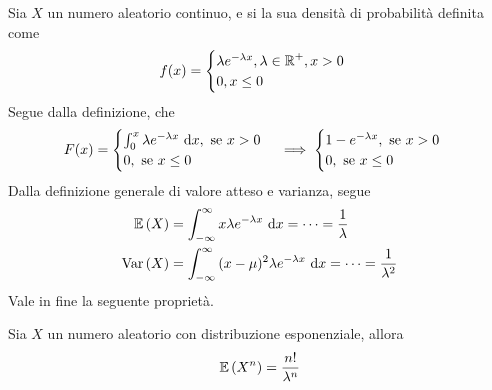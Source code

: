 \documentclass{subfiles}
\begin{document}
Sia \(X\) un numero aleatorio continuo, e si la sua densità di probabilità definita come
\[
    f(x) = \begin{cases}
        \lambda e^{-\lambda x}, \lambda \in \operatorname{\mathbb{R}}^{+}, x > 0 \\
        0, x \le 0
    \end{cases}\]
Segue dalla definizione, che
\[
    F(x) = \begin{cases}
        \Int{\lambda e^{-\lambda x}}{x}[0][x], \text{se} x > 0 \\
        0, \text{se} x \le 0
    \end{cases}   \implies \begin{cases}
        1 - e^{-\lambda x}, \text{se} x > 0 \\
        0, \text{se} x \le 0
    \end{cases}\]
Dalla definizione generale di valore atteso e varianza, segue
\[\begin{aligned}
        \Expected{X} & = \Int{x \lambda e^{-\lambda x}}{x}[-\infty][\infty] = \cdots = \Frac{1}{\lambda}               \\
        \Var{X}      & = \Int{(x - \mu)^2 \lambda e^{-\lambda x}}{x}[-\infty][\infty] = \cdots = \Frac{1}{\lambda^{2}}
    \end{aligned}\]
Vale in fine la seguente proprietà.
\begin{Property*}
    Sia \(X\) un numero aleatorio con distribuzione esponenziale, allora
    \[
        \Expected{X^{n}} = \Frac{n!}{\lambda^{n}}
    \]
\end{Property*}
\end{document}
